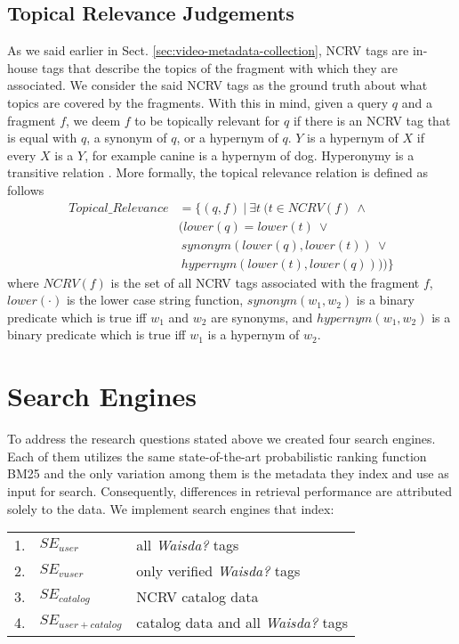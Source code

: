 \subsection{Topical Relevance Judgements}
As we said earlier in Sect. \ref{sec:video-metadata-collection}, NCRV tags are in-house tags that describe the topics of the fragment with which they are associated. We consider the said NCRV tags as the ground truth about what topics are covered by the fragments.
With this in mind, given a query $q$ and a fragment $f$, we deem $f$ to be topically relevant for $q$ if there is an NCRV tag that is equal with $q$, a synonym of $q$, or a hypernym of $q$. $Y$ is a hypernym of $X$ if every $X$ is a $Y$, for example canine is a hypernym of dog. Hyperonymy is a transitive relation \cite{wordnet}. More formally, the topical relevance relation is defined as follows
\begin{align*}
Topical\_Relevance &= \{(q,f)~|~\exists t~(t \in NCRV(f)~\wedge \\
				  &(lower(q) = lower(t)~\vee \\
				  &~synonym(lower(q), lower(t))~\vee \\
				  &~hypernym(lower(t), lower(q))))\}
\end{align*}
where $NCRV(f)$ is the set of all NCRV tags associated with the fragment $f$, $lower(\cdot)$ is the lower case string function, $synonym(w_1, w_2)$ is a binary predicate which is true iff $w_1$ and $w_2$ are synonyms, and $hypernym(w_1, w_2)$ is a binary predicate which is true iff $w_1$ is a hypernym of $w_2$. 

\section{Search Engines}\label{sec:topicir:se}
To address the research questions stated above we created four search engines. Each of them utilizes the same state-of-the-art probabilistic ranking function BM25 and the only variation among them is the metadata they index and use as input for search. Consequently, differences in retrieval performance are attributed solely to the data. We implement search engines that index:

\begin{tabular}{lll}
 1. & $SE_{user}$  & all \textit{Waisda?} tags \\
 2. & $SE_{vuser}$& only verified \textit{Waisda?} tags \\
 3. & $SE_{catalog}$&  NCRV catalog data \\
 4. & $SE_{user+catalog}$&  catalog data and all \textit{Waisda?}  tags \\
\end{tabular}

